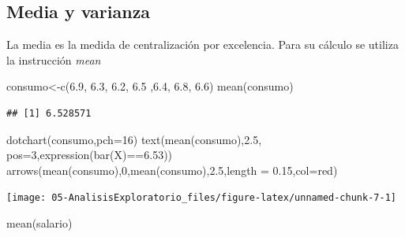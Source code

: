 \documentclass[
]{book}
\newenvironment{Shaded}{\begin{snugshade}}{\end{snugshade}}
\newcommand{\AttributeTok}[1]{\textcolor[rgb]{0.77,0.63,0.00}{#1}}
\newcommand{\DecValTok}[1]{\textcolor[rgb]{0.00,0.00,0.81}{#1}}
\newcommand{\FloatTok}[1]{\textcolor[rgb]{0.00,0.00,0.81}{#1}}
\newcommand{\FunctionTok}[1]{\textcolor[rgb]{0.00,0.00,0.00}{#1}}
\newcommand{\NormalTok}[1]{#1}
\newcommand{\OtherTok}[1]{\textcolor[rgb]{0.56,0.35,0.01}{#1}}
\newcommand{\SpecialCharTok}[1]{\textcolor[rgb]{0.00,0.00,0.00}{#1}}
\newcommand{\StringTok}[1]{\textcolor[rgb]{0.31,0.60,0.02}{#1}}
\theoremstyle{break}
\begin{document}
\hypertarget{media-y-varianza}{%
\subsection{Media y varianza}\label{media-y-varianza}}

La media es la medida de centralización por excelencia. Para su cálculo
se utiliza la instrucción \emph{mean}

\begin{Shaded}
\begin{Highlighting}[]
\NormalTok{consumo}\OtherTok{\textless{}{-}}\FunctionTok{c}\NormalTok{(}\FloatTok{6.9}\NormalTok{, }\FloatTok{6.3}\NormalTok{, }\FloatTok{6.2}\NormalTok{, }\FloatTok{6.5}\NormalTok{ ,}\FloatTok{6.4}\NormalTok{, }\FloatTok{6.8}\NormalTok{, }\FloatTok{6.6}\NormalTok{)}
\FunctionTok{mean}\NormalTok{(consumo)}
\end{Highlighting}
\end{Shaded}

\begin{verbatim}
## [1] 6.528571
\end{verbatim}

\begin{Shaded}
\begin{Highlighting}[]
\FunctionTok{dotchart}\NormalTok{(consumo,}\AttributeTok{pch=}\DecValTok{16}\NormalTok{)}
\FunctionTok{text}\NormalTok{(}\FunctionTok{mean}\NormalTok{(consumo),}\FloatTok{2.5}\NormalTok{, }\AttributeTok{pos=}\DecValTok{3}\NormalTok{,}\FunctionTok{expression}\NormalTok{(}\FunctionTok{bar}\NormalTok{(X)}\SpecialCharTok{==}\FloatTok{6.53}\NormalTok{))}
\FunctionTok{arrows}\NormalTok{(}\FunctionTok{mean}\NormalTok{(consumo),}\DecValTok{0}\NormalTok{,}\FunctionTok{mean}\NormalTok{(consumo),}\FloatTok{2.5}\NormalTok{,}\AttributeTok{length =} \FloatTok{0.15}\NormalTok{,}\AttributeTok{col=}\StringTok{\textquotesingle{}red\textquotesingle{}}\NormalTok{)}
\end{Highlighting}
\end{Shaded}

\begin{center}\texttt{[image: 05-AnalisisExploratorio\_files/figure-latex/unnamed-chunk-7-1]} \end{center}

\begin{Shaded}
\begin{Highlighting}[]
\FunctionTok{mean}\NormalTok{(salario)}
\end{Highlighting}
\end{Shaded}
\end{document}
